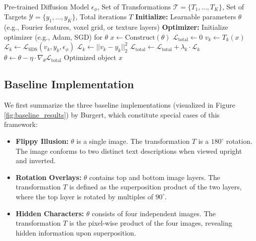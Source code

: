 \documentclass{article}
\begin{document}
\begin{algorithm}[t]
\caption{Unified Framework for Diffusion-Based Visual Illusions}
\label{alg:framework}
\begin{algorithmic}[1]
\REQUIRE Pre-trained Diffusion Model $\epsilon_\phi$, Set of Transformations $\mathcal{T} = \{T_1, \dots, T_K\}$, Set of Targets $\mathcal{Y} = \{y_1, \dots, y_K\}$, Total iterations $T$
\STATE \textbf{Initialize:} Learnable parameters $\theta$ (e.g., Fourier features, voxel grid, or texture layers)
\STATE \textbf{Optimizer:} Initialize optimizer (e.g., Adam, SGD) for $\theta$
    \STATE $x \leftarrow \text{Construct}(\theta)$ 
    \STATE $\mathcal{L}_{\text{total}} \leftarrow 0$
        \STATE $v_k \leftarrow T_k(x)$ 
            \STATE $\mathcal{L}_k \leftarrow \mathcal{L}_{\text{SDS}}(v_k, y_k, \epsilon_\phi)$ 
            \STATE $\mathcal{L}_k \leftarrow ||v_k - y_k||^2_2$ 
        \ENDIF
        \STATE $\mathcal{L}_{\text{total}} \leftarrow \mathcal{L}_{\text{total}} + \lambda_k \cdot \mathcal{L}_k$
    \ENDFOR
    \STATE $\theta \leftarrow \theta - \eta \cdot \nabla_\theta \mathcal{L}_{\text{total}}$ 
\ENDFOR
\RETURN Optimized object $x$
\end{algorithmic}
\end{algorithm}
 
\subsection{Baseline Implementation}
We first summarize the three baseline implementations (visualized in Figure \ref{fig:baseline_results}) by Burgert\cite{10.1145/3641519.3657500}, which constitute special cases of this framework:

\begin{itemize}
    \item \textbf{Flippy Illusion:} $\theta$ is a single image. The transformation $T$ is a $180^\circ$ rotation. The image conforms to two distinct text descriptions when viewed upright and inverted.
    \item \textbf{Rotation Overlays:} $\theta$ contains top and bottom image layers. The transformation $T$ is defined as the superposition product of the two layers, where the top layer is rotated by multiples of $90^\circ$.
    \item \textbf{Hidden Characters:} $\theta$ consists of four independent images. The transformation $T$ is the pixel-wise product of the four images, revealing hidden information upon superposition.
\end{itemize}
\end{document}
